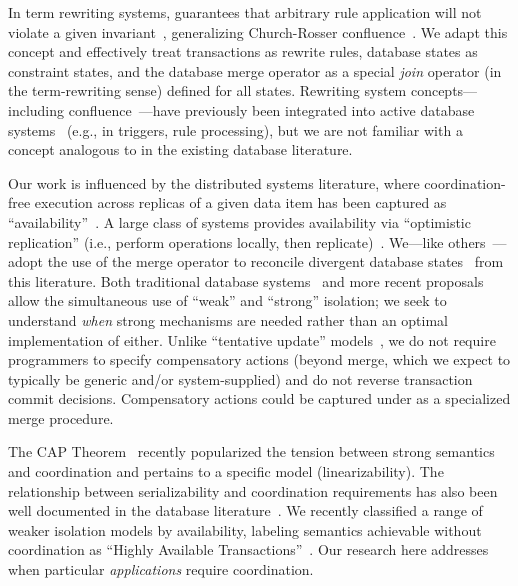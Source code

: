  In term rewriting systems, \iconfluence
guarantees that arbitrary rule application will not violate a given
invariant~\cite{obs-confluence}, generalizing Church-Rosser
confluence~\cite{termrewriting}. We adapt this concept and effectively
treat transactions as rewrite rules, database states as constraint
states, and the database merge operator as a special \textit{join}
operator (in the term-rewriting sense) defined for all
states. Rewriting system concepts---including
confluence~\cite{aiken-confluence}---have previously been integrated
into active database systems~\cite{activedb-book} (e.g., in triggers,
rule processing), but we are not familiar with a concept analogous to
\iconfluence in the existing database literature.

 Our work is
influenced by the distributed systems literature, where
coordination-free execution across replicas of a given data item has
been captured as ``availability''~\cite{gilbert-cap,queue}. A large
class of systems provides availability via ``optimistic replication''
(i.e., perform operations locally, then
replicate)~\cite{optimistic}. We---like others~\cite{ec-txns}---adopt
the use of the merge operator to reconcile divergent database
states~\cite{bayou} from this literature. Both traditional database
systems~\cite{adya-isolation} and more recent
proposals~\cite{redblue-new, redblue} allow the simultaneous use of
``weak'' and ``strong'' isolation; we seek to understand \textit{when}
strong mechanisms are needed rather than an optimal implementation of
either. Unlike ``tentative update'' models~\cite{sagas}, we do not
require programmers to specify compensatory actions (beyond merge,
which we expect to typically be generic and/or system-supplied) and do
not reverse transaction commit decisions. Compensatory actions could
be captured under \iconfluence as a specialized merge procedure.

The CAP Theorem~\cite{gilbert-cap,pacelc} recently popularized the
tension between strong semantics and coordination and pertains to a
specific model (linearizability). The relationship between
serializability and coordination requirements has also been well
documented in the database literature~\cite{davidson-survey}. We
recently classified a range of weaker isolation models by
availability, labeling semantics achievable without coordination as
``Highly Available Transactions''~\cite{hat-vldb}. Our research here addresses
when particular \textit{applications} require coordination.

